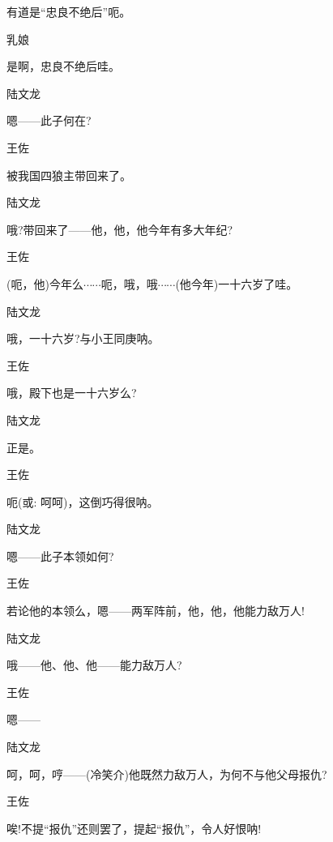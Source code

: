 {{{有道是``忠良不绝后''呃。}

{乳娘\hspace{30pt}~

是啊，忠良不绝后哇。}

{陆文龙\hspace{20pt}~

嗯------此子何在?}

{王佐\hspace{30pt}~

被我国四狼主带回来了。}

{陆文龙\hspace{20pt}~

哦?带回来了------他，他，他今年有多大年纪?}

{王佐

(呃，他)今年么$\cdots{}\cdots{}$呃，哦，哦$\cdots{}\cdots{}$(他今年)一十六岁了哇。}

{陆文龙\hspace{20pt}~

哦，一十六岁?与小王同庚呐。}

{王佐\hspace{30pt}~

哦，殿下也是一十六岁么?}

{陆文龙\hspace{20pt}~

正是。}

{王佐\hspace{30pt}~

呃({\akai 或}: 呵呵)，这倒巧得很呐。}

{陆文龙\hspace{20pt}~

嗯------此子本领如何?}

{王佐\hspace{30pt}~

若论他的本领么，嗯------两军阵前，他，他，他能力敌万人!}

{陆文龙\hspace{20pt}~

哦------他、他、他------能力敌万人?}

{王佐\hspace{30pt}~

嗯------}

{陆文龙

呵，呵，哼------(冷笑介)他既然力敌万人，为何不与他父母报仇?}

{王佐\hspace{30pt}~

唉!不提``报仇''还则罢了，提起``报仇''，令人好恨呐!}

}}
